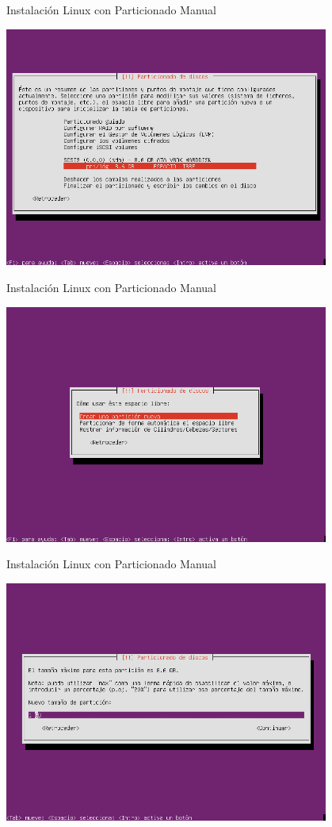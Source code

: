 \begin{frame}{Instalación Linux con Particionado Manual}
 \begin{center}
  \includegraphics[width=0.8\textwidth]{images/install5.png}
 \end{center}
\end{frame}

\begin{frame}{Instalación Linux con Particionado Manual}
 \begin{center}
  \includegraphics[width=0.8\textwidth]{images/install6.png}
 \end{center}
\end{frame}

\begin{frame}{Instalación Linux con Particionado Manual}
 \begin{center}
  \includegraphics[width=0.8\textwidth]{images/install7.png}
 \end{center}
\end{frame}


